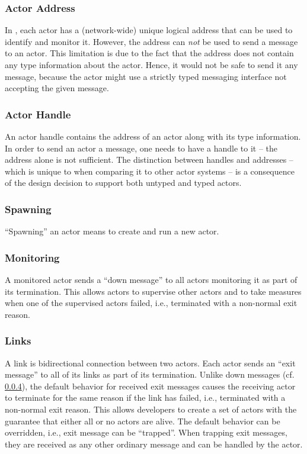 \subsubsection{Actor Address}

In \libcppa, each actor has a (network-wide) unique logical address that can be used to identify and monitor it.
However, the address can \emph{not} be used to send a message to an actor.
This limitation is due to the fact that the address does not contain any type information about the actor.
Hence, it would not be safe to send it any message, because the actor might use a strictly typed messaging interface not accepting the given message.

\subsubsection{Actor Handle}

An actor handle contains the address of an actor along with its type information.
In order to send an actor a message, one needs to have a handle to it -- the address alone is not sufficient.
The distinction between handles and addresses -- which is unique to \libcppa when comparing it to other actor systems -- is a consequence of the design decision to support both untyped and typed actors.

\subsubsection{Spawning}

``Spawning'' an actor means to create and run a new actor.

\subsubsection{Monitoring}
\label{sec:monitoring}

A monitored actor sends a ``down message'' to all actors monitoring it as part of its termination.
This allows actors to supervise other actors and to take measures when one of the supervised actors failed, i.e., terminated with a non-normal exit reason.

\subsubsection{Links}

A link is bidirectional connection between two actors.
Each actor sends an ``exit message'' to all of its links as part of its termination.
Unlike down messages (cf. \ref{sec:monitoring}), the default behavior for received exit messages causes the receiving actor to terminate for the same reason if the link has failed, i.e., terminated with a non-normal exit reason.
This allows developers to create a set of actors with the guarantee that either all or no actors are alive.
The default behavior can be overridden, i.e., exit message can be ``trapped''.
When trapping exit messages, they are received as any other ordinary message and can be handled by the actor.